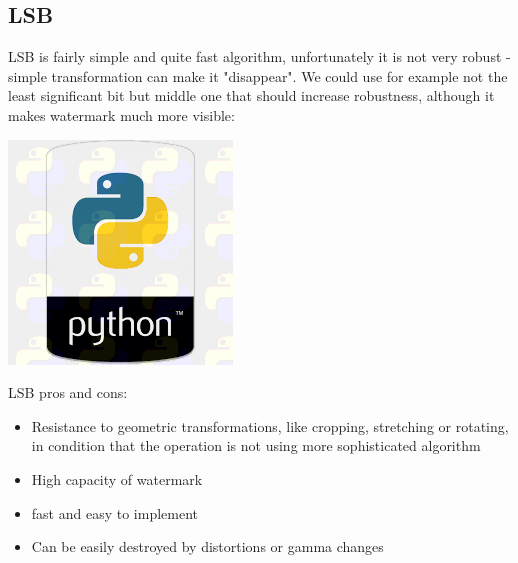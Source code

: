 \documentclass[a4paper, 12pt]{article}
\begin{document}
	\subsection{LSB}

	LSB is fairly simple and quite fast algorithm, unfortunately it is not very robust - simple transformation can make it "disappear". We could use for example not the least significant bit but middle one that should increase robustness, although it makes watermark much more visible:



	 \begin{center}
		\includegraphics[scale=0.5]{python_lsb/watermarked_python_4bit.png}
	\end{center}

	LSB pros and cons:
	\begin{itemize}

		\item Resistance to geometric transformations, like cropping, stretching or rotating, in condition that the operation is not using more sophisticated algorithm
		\item High capacity of watermark
		\item fast and easy to implement
		\item Can be easily destroyed by distortions or gamma changes




	\end{itemize}

	
\end{document}
